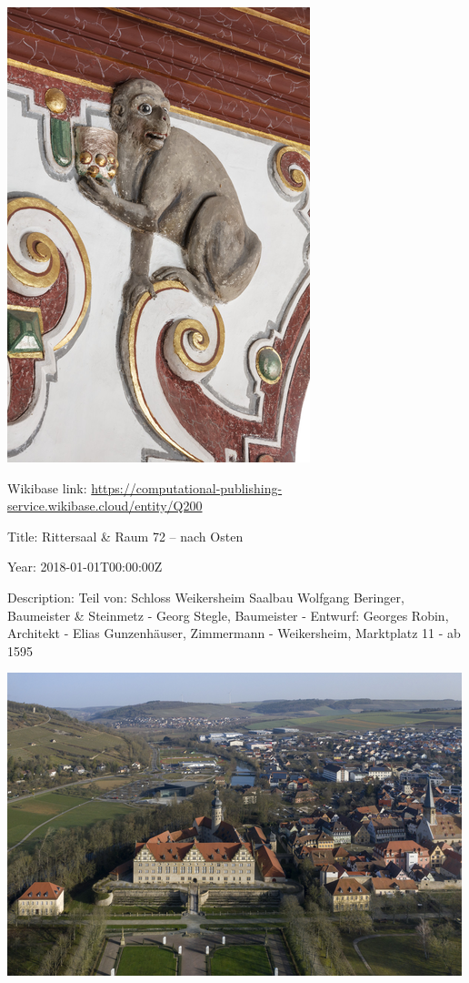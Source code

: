 \documentclass[
  letterpaper,
]{book}
\begin{document}
\includegraphics{paintings_files/figure-pdf/cell-3-output-10.png}

Wikibase link:
\url{https://computational-publishing-service.wikibase.cloud/entity/Q200}

Title: Rittersaal \& Raum 72 -- nach Osten

Year: 2018-01-01T00:00:00Z

Description: Teil von: Schloss Weikersheim Saalbau Wolfgang Beringer,
Baumeister \& Steinmetz - Georg Stegle, Baumeister - Entwurf: Georges
Robin, Architekt - Elias Gunzenhäuser, Zimmermann - Weikersheim,
Marktplatz 11 - ab 1595

\includegraphics{paintings_files/figure-pdf/cell-3-output-12.png}
\end{document}
